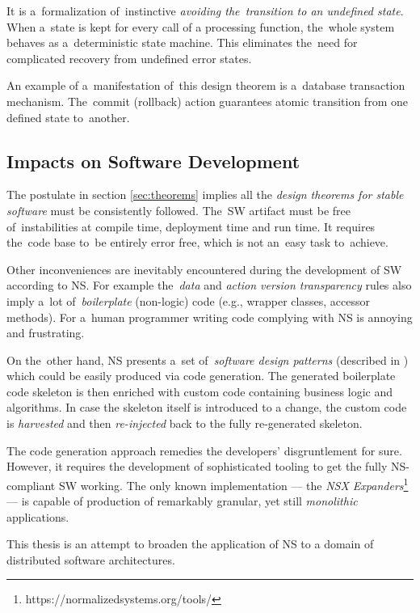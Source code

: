 \documentclass[thesis=M,english,hidelinks]{FITthesis}[2012/10/20]
\begin{document}
It is a~formalization of~instinctive \emph{avoiding the~transition to an undefined state}. When a~state is kept for every call of a processing function, the~whole system behaves as a~deterministic state machine. This eliminates the~need for complicated recovery from undefined error states.

An example of a~manifestation of~this design theorem is a~database transaction mechanism. The~commit (rollback) action guarantees atomic transition from one defined state to~another.

\subsection{Impacts on Software Development}
The postulate in section \ref{sec:theorems} implies all the \textit{design theorems for stable software} must be consistently followed. The~\acrshort{SW} artifact must be free of~instabilities at compile time, deployment time and run time. It requires the~code base to~be entirely error free, which is not an~easy task to~achieve.

Other inconveniences are inevitably encountered during the development of \acrshort{SW} according to \acrshort{NS}. For example the~\emph{data} and \emph{action version transparency} rules also imply a~lot of~\textit{boilerplate} (non-logic) code (e.g., wrapper classes, accessor methods). For a~human programmer writing code complying with \acrshort{NS} is annoying and frustrating.

On the~other hand, \acrshort{NS} presents a~set of~\emph{software design patterns} (described in \cite{ns-recreating}) which could be easily produced via code generation. The generated boilerplate code skeleton is then enriched with custom code containing business logic and algorithms. In case the skeleton itself is introduced to a change, the custom code is \textit{harvested} and then \textit{re-injected} back to the fully re-generated skeleton.~\cite{vk-bp}

The code generation approach remedies the developers' disgruntlement for sure. However, it requires the development of sophisticated tooling to get the fully \acrshort{NS}-compliant \acrlong{SW} working. The only known implementation --- the \textit{NSX Expanders}\footnote{https://normalizedsystems.org/tools/} --- is capable of production of remarkably granular, yet still \textit{monolithic} applications.

This thesis is an attempt to broaden the application of \acrlong{NS} to a domain of distributed software architectures.
\end{document}
